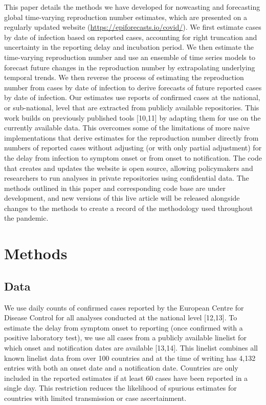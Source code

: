 \documentclass[]{article}
\begin{document}
This paper details the methods we have developed for nowcasting and
forecasting global time-varying reproduction number estimates, which are
presented on a regularly updated website
(\url{https://epiforecasts.io/covid/}). We first estimate cases by date
of infection based on reported cases, accounting for right truncation
and uncertainty in the reporting delay and incubation period. We then
estimate the time-varying reproduction number and use an ensemble of
time series models to forecast future changes in the reproduction number
by extrapolating underlying temporal trends. We then reverse the process
of estimating the reproduction number from cases by date of infection to
derive forecasts of future reported cases by date of infection. Our
estimates use reports of confirmed cases at the national, or
sub-national, level that are extracted from publicly available
repositories. This work builds on previously published tools {[}10,11{]}
by adapting them for use on the currently available data. This overcomes
some of the limitations of more naive implementations that derive
estimates for the reproduction number directly from numbers of reported
cases without adjusting (or with only partial adjustment) for the delay
from infection to symptom onset or from onset to notification. The code
that creates and updates the website is open source, allowing
policymakers and researchers to run analyses in private repositories
using confidential data. The methods outlined in this paper and
corresponding code base are under development, and new versions of this
live article will be released alongside changes to the methods to create
a record of the methodology used throughout the pandemic.

\hypertarget{methods}{%
\section{Methods}\label{methods}}

\hypertarget{data}{%
\subsection{Data}\label{data}}

We use daily counts of confirmed cases reported by the European Centre
for Disease Control for all analyses conducted at the national level
{[}12,13{]}. To estimate the delay from symptom onset to reporting (once
confirmed with a positive laboratory test), we use all cases from a
publicly available linelist for which onset and notification dates are
available {[}13,14{]}. This linelist combines all known linelist data
from over 100 countries and at the time of writing has 4,132 entries
with both an onset date and a notification date. Countries are only
included in the reported estimates if at least 60 cases have been
reported in a single day. This restriction reduces the likelihood of
spurious estimates for countries with limited transmission or case
ascertainment.
\end{document}
